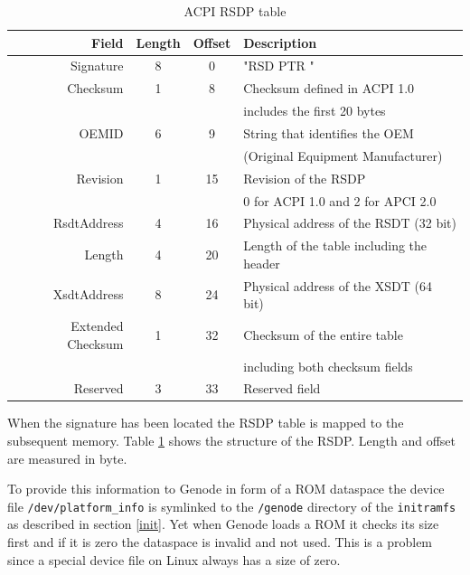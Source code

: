 \documentclass[
a4paper,
11pt,
twoside
]{report}
\begin{document}
		\begin{table}[]
			\centering
			\begin{tabular}{r|c|c|l}
				Field             & Length & Offset & Description                                                      \\ \hline
				Signature         & 8      & 0      & "RSD PTR "                                                       \\ \hline
				Checksum          & 1      & 8      & Checksum defined in ACPI 1.0 \\
				&&& includes the first 20 bytes        \\ \hline
				OEMID             & 6      & 9      & String that identifies the OEM \\ 
				&&& (Original Equipment Manufacturer) \\ \hline
				Revision          & 1      & 15     & Revision of the RSDP \\
				&&& 0 for ACPI 1.0 and 2 for APCI 2.0          \\ \hline
				RsdtAddress       & 4      & 16     & Physical address of the RSDT (32 bit)                            \\ \hline
				Length            & 4      & 20     & Length of the table including the header                         \\ \hline
				XsdtAddress       & 8      & 24     & Physical address of the XSDT (64 bit)                            \\ \hline
				Extended Checksum & 1      & 32     & Checksum of the entire table \\
				&&& including both checksum fields     \\ \hline
				Reserved          & 3      & 33     & Reserved field                                                  
			\end{tabular}
			\caption{ACPI RSDP table \citep{acpi_spec}}
			\label{rsdp}
		\end{table}
	
		When the signature has been located the RSDP table is mapped to the subsequent memory.
		Table \ref{rsdp} shows the structure of the RSDP.
		Length and offset are measured in byte.
		
		To provide this information to Genode in form of a ROM dataspace the device file \texttt{/dev/platform\_info} is symlinked to the \texttt{/genode} directory of the \texttt{initramfs} as described in section \ref{init}.
		Yet when Genode loads a ROM it checks its size first and if it is zero the dataspace is invalid and not used.
		This is a problem since a special device file on Linux always has a size of zero.
		
\end{document}
